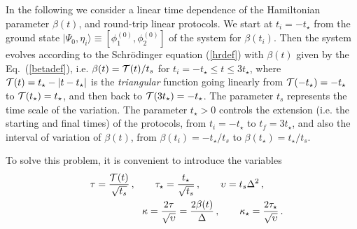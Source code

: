 In the following we consider a linear time dependence of the
Hamiltonian parameter $\beta(t)$, and round-trip linear protocols.  We
start at $t_i=-t_\star$ from the ground state $|\Psi_0,\eta_i\rangle
\equiv [\phi_1^{(0)},\phi_2^{(0)}]$ of the system for
$\beta(t_i)$. Then the system evolves according to the Schr\"odinger
equation (\ref{hrdef}) with $\beta(t)$ given by the
Eq.~(\ref{betadef}), i.e. $\beta(t) = {{\cal T}(t)/t_s}$ for
$t_i=-t_\star \le t \le 3t_\star$, where $ {\cal T}(t) = t_\star -
|t-t_\star|$ is the {\em triangular} function going linearly from
${\cal T}(-t_\star)=-t_\star$ to ${\cal T}(t_\star)=t_\star$, and then
back to ${\cal T}(3t_\star)=-t_\star$. The parameter $t_s$ represents
the time scale of the variation. The parameter $t_\star>0$ controls
the extension (i.e.  the starting and final times) of the protocols,
from $t_i=-t_\star$ to $t_f = 3 t_\star$, and also the interval of
variation of $\beta(t)$, from $\beta(t_i)=-t_\star/t_s$ to
$\beta(t_\star) = t_\star/t_s$.

To solve this problem, it is convenient to introduce the
variables
\begin{eqnarray}
&&\tau = {{\cal T}(t)\over\sqrt{t_s}}\,, \qquad \tau_\star =
       {t_\star\over \sqrt{t_s}}\,,\qquad
       \upsilon = t_s \Delta^2\,, \qquad \label{scalingvar}\\
       && \kappa = {2 \tau\over \sqrt{\upsilon}} = {2\beta(t)\over \Delta}
       \,,\qquad
       \kappa_\star = {2 \tau_\star\over \sqrt{\upsilon}}\,.
       \label{scaloingvar2}
\end{eqnarray}

